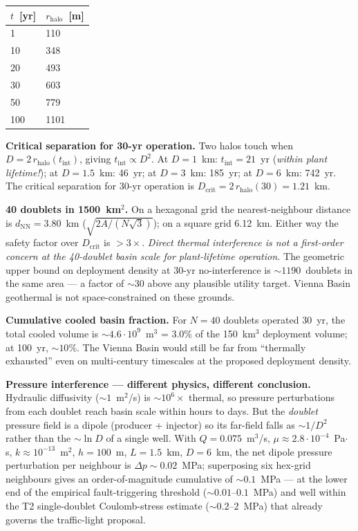 \documentclass{article}
\begin{document}
\begin{center}
\begin{tabular}{ll}
\hline
\textbf{$t$~[yr]} & \textbf{$r_{\mathrm{halo}}$~[m]} \\
\hline
1    & 110  \\
10   & 348  \\
20   & 493  \\
30   & 603  \\
50   & 779  \\
100  & 1101 \\
\hline
\end{tabular}
\end{center}

\textbf{Critical separation for 30-yr operation.} Two halos
touch when $D = 2\,r_{\mathrm{halo}}(t_{\mathrm{int}})$, giving
$t_{\mathrm{int}} \propto D^{2}$. At
$D = 1$~km: $t_{\mathrm{int}} = 21$~yr (\emph{within plant
lifetime!}); at $D = 1.5$~km: 46~yr; at $D = 3$~km: 185~yr; at
$D = 6$~km: 742~yr. The critical separation for 30-yr operation
is $D_{\mathrm{crit}} = 2\,r_{\mathrm{halo}}(30) = 1.21$~km.

\textbf{40 doublets in 1500~km$^2$.} On a hexagonal grid the
nearest-neighbour distance is $d_{\mathrm{NN}} = 3.80$~km
($\sqrt{2A/(N\sqrt{3})}$); on a square grid 6.12~km. Either way
the safety factor over $D_{\mathrm{crit}}$ is $> 3\times$.
\emph{Direct thermal interference is not a first-order concern at
the 40-doublet basin scale for plant-lifetime operation.} The
geometric upper bound on deployment density at 30-yr
no-interference is $\sim 1190$~doublets in the same area --- a
factor of $\sim 30$ above any plausible utility target. Vienna
Basin geothermal is not space-constrained on these grounds.

\textbf{Cumulative cooled basin fraction.} For $N=40$ doublets
operated 30~yr, the total cooled volume is $\sim 4.6 \cdot
10^{9}$~m$^3$ = 3.0\% of the 150~km$^3$ deployment volume; at
100~yr, $\sim 10\%$. The Vienna Basin would still be far from
``thermally exhausted'' even on multi-century timescales at the
proposed deployment density.

\textbf{Pressure interference --- different physics, different
conclusion.} Hydraulic diffusivity ($\sim 1$~m$^2$/s) is
$\sim 10^{6}\times$ thermal, so pressure perturbations from each
doublet reach basin scale within hours to days. But the
\emph{doublet} pressure field is a dipole (producer + injector)
so its far-field falls as $\sim 1/D^{2}$ rather than the
$\sim \ln D$ of a single well. With $Q = 0.075$~m$^3$/s,
$\mu \approx 2.8 \cdot 10^{-4}$~Pa$\cdot$s, $k \approx
10^{-13}$~m$^2$, $h = 100$~m, $L = 1.5$~km, $D = 6$~km, the net
dipole pressure perturbation per neighbour is
$\Delta p \sim 0.02$~MPa; superposing six hex-grid neighbours
gives an order-of-magnitude cumulative of $\sim 0.1$~MPa --- at
the lower end of the empirical fault-triggering threshold
($\sim 0.01$--$0.1$~MPa) and well within the T2
single-doublet Coulomb-stress estimate ($\sim 0.2$--$2$~MPa)
that already governs the traffic-light proposal.
\end{document}
